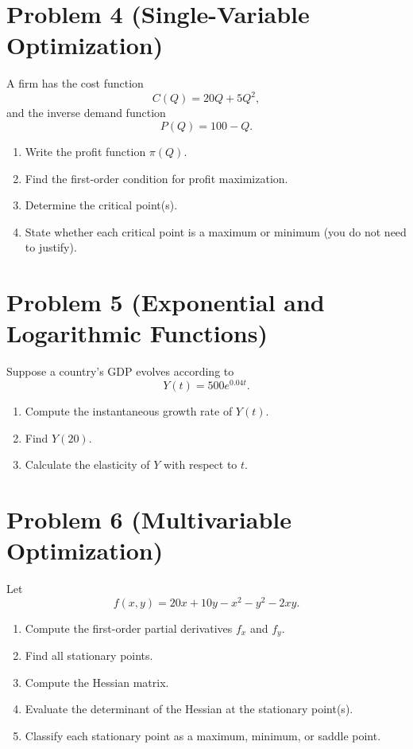 \documentclass[12pt]{article}
\begin{document}
\section*{Problem 4 (Single-Variable Optimization)}

A firm has the cost function
\[
C(Q)=20Q + 5Q^2,
\]
and the inverse demand function
\[
P(Q)=100 - Q.
\]

\begin{enumerate}
    \item Write the profit function \(\pi(Q)\).
    \item Find the first-order condition for profit maximization.
    \item Determine the critical point(s).
    \item State whether each critical point is a maximum or minimum (you do not need to justify).
\end{enumerate}



\section*{Problem 5 (Exponential and Logarithmic Functions)}

Suppose a country's GDP evolves according to
\[
Y(t)=500 e^{0.04t}.
\]

\begin{enumerate}
    \item Compute the instantaneous growth rate of \(Y(t)\).
    \item Find \(Y(20)\).
    \item Calculate the elasticity of \(Y\) with respect to \(t\).
\end{enumerate}



\section*{Problem 6 (Multivariable Optimization)}

Let
\[
f(x,y)=20x + 10y - x^2 - y^2 - 2xy.
\]

\begin{enumerate}
    \item Compute the first-order partial derivatives \(f_x\) and \(f_y\).
    \item Find all stationary points.
    \item Compute the Hessian matrix.
    \item Evaluate the determinant of the Hessian at the stationary point(s).
    \item Classify each stationary point as a maximum, minimum, or saddle point.
\end{enumerate}
\end{document}
